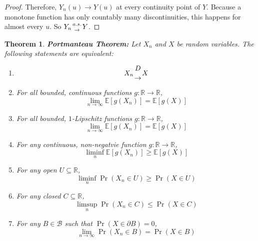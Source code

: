 \documentclass{article}
\newtheorem{theorem}{Theorem}
\theoremstyle{definition}\newtheorem{definition}{DEF}
\theoremstyle{definition}\newtheorem{example}{Ex}
\theoremstyle{lemma}\newtheorem{lemma}{Lemma}
\theoremstyle{corrolary}\newtheorem{corrolary}{Cor}
\begin{document}
\begin{proof}
Therefore, $Y_n(u)\rightarrow Y(u)$ at every continuity point of $Y$.
Because a monotone function has only countably many discontinuities, this happens for almost every $u$.
So $Y_n {a.s. \atop \rightarrow} Y$.
\end{proof}

\begin{theorem}
\textbf{Portmanteau Theorem:}
Let $X_n$ and $X$ be random variables.
The following statements are equivalent:
\begin{enumerate}
\item 
\begin{equation}
X_n {D \atop \rightarrow} X
\end{equation}
\item For all bounded, continuous functions $g: \mathbb{R} \rightarrow \mathbb{R}$,
\begin{equation}
\lim_{n\rightarrow \infty} \mathbb{E}[g(X_n)] = \mathbb{E}[g(X)]
\end{equation}
\item For all bounded, $1$-Lipschitz functions $g: \mathbb{R} \rightarrow \mathbb{R}$,
\begin{equation}
\lim_{n\rightarrow \infty} \mathbb{E}[g(X_n)] = \mathbb{E}[g(X)]
\end{equation}
\item For any continuous, non-negatvie function $g: \mathbb{R} \rightarrow \mathbb{R}$,
\begin{equation}
\liminf_n \mathbb{E}[g(X_n)] \geq \mathbb{E}[g(X)]
\end{equation}
\item For any open $U\subseteq \mathbb{R}$,
\begin{equation}
\liminf_n \Pr\left( X_n \in U\right) \geq \Pr \left( X \in U \right)
\end{equation}
\item For any closed $C\subseteq \mathbb{R}$,
\begin{equation}
\limsup_n \Pr \left( X_n \in C\right) \leq \Pr \left( X \in C\right)
\end{equation}
\item For any $B \in \mathcal{B}$ such that $\Pr (X \in \partial B)=0$,
\begin{equation}
\lim_{n\rightarrow \infty} \Pr\left( X_n \in B\right) = \Pr \left( X \in B\right)
\end{equation}
\end{enumerate}
\end{theorem}
\end{document}
